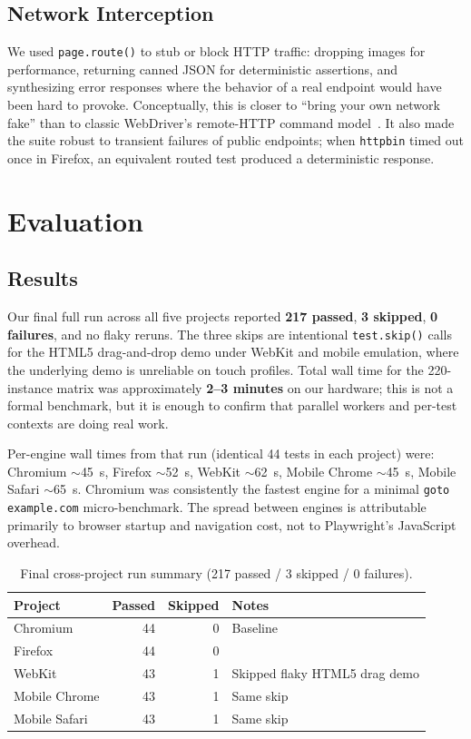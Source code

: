 \documentclass[12pt,letterpaper]{article}
\newcommand{\code}[1]{\texttt{#1}}
\begin{document}
\subsection{Network Interception}

We used \code{page.route()} to stub or block HTTP traffic: dropping images for performance, returning canned JSON for deterministic assertions, and synthesizing error responses where the behavior of a real endpoint would have been hard to provoke. Conceptually, this is closer to ``bring your own network fake'' than to classic WebDriver's remote-HTTP command model~\cite{selenium}. It also made the suite robust to transient failures of public endpoints; when \code{httpbin} timed out once in Firefox, an equivalent routed test produced a deterministic response.

\section{Evaluation}

\subsection{Results}

Our final full run across all five projects reported \textbf{217 passed}, \textbf{3 skipped}, \textbf{0 failures}, and no flaky reruns. The three skips are intentional \code{test.skip()} calls for the HTML5 drag-and-drop demo under WebKit and mobile emulation, where the underlying demo is unreliable on touch profiles. Total wall time for the 220-instance matrix was approximately \textbf{2--3 minutes} on our hardware; this is not a formal benchmark, but it is enough to confirm that parallel workers and per-test contexts are doing real work.

Per-engine wall times from that run (identical 44 tests in each project) were: Chromium $\sim$45~s, Firefox $\sim$52~s, WebKit $\sim$62~s, Mobile Chrome $\sim$45~s, Mobile Safari $\sim$65~s. Chromium was consistently the fastest engine for a minimal \code{goto example.com} micro-benchmark. The spread between engines is attributable primarily to browser startup and navigation cost, not to Playwright's JavaScript overhead.

\begin{table}[H]
\centering
\small
\begin{tabular}{@{}lrrl@{}}
\toprule
\textbf{Project} & \textbf{Passed} & \textbf{Skipped} & \textbf{Notes} \\
\midrule
Chromium       & 44 & 0 & Baseline \\
Firefox        & 44 & 0 & \\
WebKit         & 43 & 1 & Skipped flaky HTML5 drag demo \\
Mobile Chrome  & 43 & 1 & Same skip \\
Mobile Safari  & 43 & 1 & Same skip \\
\bottomrule
\end{tabular}
\caption{Final cross-project run summary (217 passed / 3 skipped / 0 failures).}
\label{tab:run}
\end{table}
\end{document}
